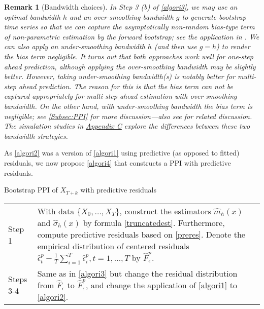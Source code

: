 \documentclass[a4paper]{article}
\newtheorem{Remark}{Remark}[section]
\begin{document}
\begin{Remark}[Bandwidth choices]\label{Remark:suboprate}
    In Step 3 (b) of \cref{algori3}, we may use an
optimal bandwidth $h$ and an  over-smoothing bandwidth $g$ to generate bootstrap time series so that we can capture the asymptotically non-random bias-type term of non-parametric estimation by the forward bootstrap; see the application in \cite{franke2002bootstrap}. We can also apply
an  under-smoothing bandwidth $h$ (and then use $g=h$) to render the
 bias term negligible. It turns out that
both approaches %
work well for one-step ahead prediction, although applying the over-smoothing bandwidth may be slightly better. 
However, taking under-smoothing bandwidth(s) is notably better for multi-step ahead prediction. The reason for this is that the bias term can not be captured appropriately for multi-step ahead estimation with over-smoothing bandwidth. On the other hand, with under-smoothing bandwidth  the bias term is negligible; see \cref{Subsec:PPI} for more discussion---also see \cite{politisstudentization} for related discussion. The simulation studies in \hyperref[Appendix:diffoverunderband]{Appendix C}  explore the differences between these two bandwidth strategies.  
\end{Remark}

  
As \cref{algori2} was a version of \cref{algori1} using  
predictive (as opposed to fitted) residuals, we now propose \cref{algori4} 
that constructs a PPI with predictive residuals. 

\begin{algorithm}[htbp]
\caption{Bootstrap PPI of $X_{T+k}$ with predictive residuals} 
\label{algori4}
  \begin{tabularx}{\textwidth}{lX}   
    Step 1 & With data $\{X_{0},\ldots,X_{T}\}$, construct the estimators $\widehat{m}_h(x)$ and $\widehat{\sigma}_h(x)$ by formula \cref{truncatedest}. Furthermore, compute predictive residuals based on \cref{preres}. Denote the empirical distribution of centered residuals $\hat{\epsilon}^p_t - \frac{1}{T}\sum_{i=1}^{T}\hat{\epsilon}^p_i, t= 1,\ldots,T$ by $\widehat{F}^p_{\epsilon}$.\\
    Steps 3-4 &  Same as in \cref{algori3} but
change the residual distribution from $\widehat{F}_{\epsilon}$ to $\widehat{F}^{p}_{\epsilon}$, and change the application of \cref{algori1} to \cref{algori2}.
  \end{tabularx}
\end{algorithm}
\end{document}
